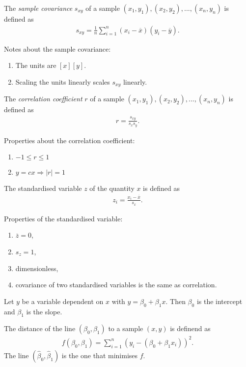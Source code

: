 \documentclass{article}
\renewcommand{\bar}{\overline}
\begin{document}
\begin{definition}
	The \emph{sample covariance} $s_{xy}$ of a sample $(x_1, y_1), (x_2, y_2), ..., (x_n, y_n)$
	is defined as
	\begin{align*}
		s_{xy} = \frac{1}{n}\sum_{i=1}^n (x_i - \bar x)(y_i - \bar y).
	\end{align*}
\end{definition}
Notes about the sample covariance:
\begin{enumerate}
	\item The units are $[x][y]$.
	\item Scaling the units linearly scales $s_{xy}$ linearly.
\end{enumerate}
\begin{definition}
	The \emph{correlation coefficient} $r$ of a sample $(x_1, y_1), (x_2, y_2), ..., (x_n, y_n)$ is defined as
	\begin{align*}
		r = \frac{s_{xy}}{s_x s_y}.
	\end{align*}
\end{definition}
Properties about the correlation coefficient:
\begin{enumerate}
	\item $-1 \leq r \leq 1$
	\item $y=cx \Rightarrow |r|=1$
\end{enumerate}
\begin{definition}
	The standardised variable $z$ of the quantity $x$ is defined as
	\begin{align*}
		z_i = \frac{x_i-\bar x}{s_x}.
	\end{align*}
\end{definition}
Properties of the standardised variable:
\begin{enumerate}
	\item $\bar z = 0$,
	\item $s_z = 1$,
	\item dimensionless,
	\item covariance of two standardised variables is the same as correlation.
\end{enumerate}
\begin{definition}
	Let $y$ be a variable dependent on $x$ with $y=\beta_0 + \beta_1 x$. Then
	$\beta_0$ is the intercept and $\beta_1$ is the slope.
\end{definition}
\begin{definition}
	The distance of the line $(\beta_0,\beta_1)$ to a sample $(x,y)$ is definend as
	\begin{align*}
		f(\beta_0, \beta_1) = \sum_{i=1}^n (y_i -(\beta_0 + \beta_1 x_i))^2.
	\end{align*}
	The line $(\hat\beta_0, \hat\beta_1)$ is the one that minimises $f$.
\end{definition}
\end{document}
